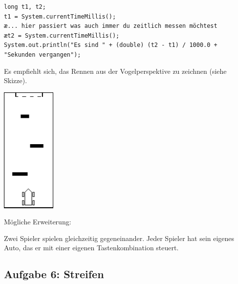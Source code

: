 \begin{lstlisting}
long t1, t2;
t1 = System.currentTimeMillis();
æ... hier passiert was auch immer du zeitlich messen möchtest
æt2 = System.currentTimeMillis();
System.out.println("Es sind " + (double) (t2 - t1) / 1000.0 + "Sekunden vergangen");
\end{lstlisting}

Es empfiehlt sich, das Rennen aus der Vogelperspektive zu zeichnen (siehe Skizze).

\begin{center}
\includegraphics[width=0.2\textwidth]{./inf/SEKII/21_Java_Tastaturereignisse/Autorennen.png}
\end{center}

Mögliche Erweiterung:

Zwei Spieler spielen gleichzeitig gegeneinander. Jeder Spieler hat sein eigenes
Auto, das er mit einer eigenen Tastenkombination steuert.


\subsection{Aufgabe 6: Streifen}

